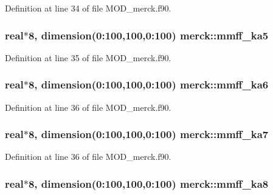 Definition at line 34 of file M\-O\-D\-\_\-merck.\-f90.

\hypertarget{classmerck_a2a3aaed35edbf54ad9f93fc1efc3ed31}{
\subsubsection[{mmff\-\_\-ka5}]{\setlength{\rightskip}{0pt plus 5cm}real$\ast$8, dimension(0\-:100,100,0\-:100) merck\-::mmff\-\_\-ka5}}\label{classmerck_a2a3aaed35edbf54ad9f93fc1efc3ed31}


Definition at line 35 of file M\-O\-D\-\_\-merck.\-f90.

\hypertarget{classmerck_a1f8811f68739a037f88c704f17379501}{
\subsubsection[{mmff\-\_\-ka6}]{\setlength{\rightskip}{0pt plus 5cm}real$\ast$8, dimension(0\-:100,100,0\-:100) merck\-::mmff\-\_\-ka6}}\label{classmerck_a1f8811f68739a037f88c704f17379501}


Definition at line 36 of file M\-O\-D\-\_\-merck.\-f90.

\hypertarget{classmerck_a674c2b487209fdd0745881cab7d6c516}{
\subsubsection[{mmff\-\_\-ka7}]{\setlength{\rightskip}{0pt plus 5cm}real$\ast$8, dimension(0\-:100,100,0\-:100) merck\-::mmff\-\_\-ka7}}\label{classmerck_a674c2b487209fdd0745881cab7d6c516}


Definition at line 36 of file M\-O\-D\-\_\-merck.\-f90.

\hypertarget{classmerck_a7302e61e27f36aad1c7545fb79f3b5c3}{
\subsubsection[{mmff\-\_\-ka8}]{\setlength{\rightskip}{0pt plus 5cm}real$\ast$8, dimension(0\-:100,100,0\-:100) merck\-::mmff\-\_\-ka8}}\label{classmerck_a7302e61e27f36aad1c7545fb79f3b5c3}


